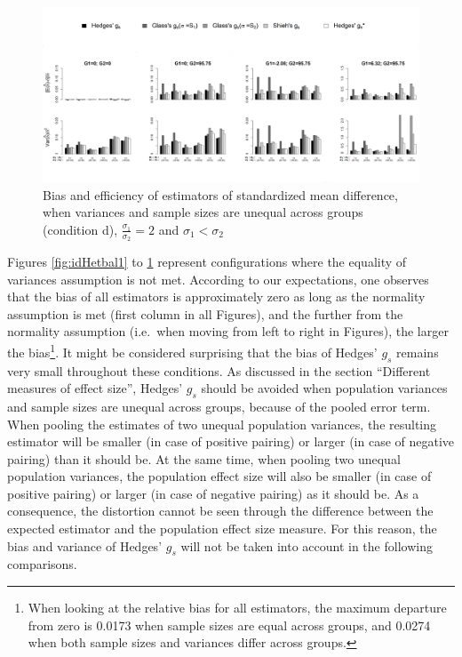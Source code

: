 \documentclass[
  english,
  man,floatsintext]{apa6}
\begin{document}
\begin{figure}

{\centering \includegraphics[width=6.31in]{Scripts outputs/Quality of ES measures/Graphs/Unbiased estimators/Combined Figures_relative quality/Het_firstsmaller_SDR2} 

}

\caption{Bias and efficiency of estimators of standardized mean difference, when variances and sample sizes are unequal across groups (condition d), $\frac{\sigma_1}{\sigma_2}=2$ and $\sigma_1<\sigma_2$}\label{fig:idHetunbal4}
\end{figure}

Figures \ref{fig:idHetbal1} to \ref{fig:idHetunbal4} represent configurations where the equality of variances assumption is not met. According to our expectations, one observes that the bias of all estimators is approximately zero as long as the normality assumption is met (first column in all Figures), and the further from the normality assumption (i.e.~when moving from left to right in Figures), the larger the bias\footnote{When looking at the relative bias for all estimators, the maximum departure from zero is 0.0173 when sample sizes are equal across groups, and 0.0274 when both sample sizes and variances differ across groups.}. It might be considered surprising that the bias of Hedges' \(g_s\) remains very small throughout these conditions. As discussed in the section \enquote{Different measures of effect size}, Hedges' \(g_s\) should be avoided when population variances and sample sizes are unequal across groups, because of the pooled error term. When pooling the estimates of two unequal population variances, the resulting estimator will be smaller (in case of positive pairing) or larger (in case of negative pairing) than it should be. At the same time, when pooling two unequal population variances, the population effect size will also be smaller (in case of positive pairing) or larger (in case of negative pairing) as it should be. As a consequence, the distortion cannot be seen through the difference between the expected estimator and the population effect size measure. For this reason, the bias and variance of Hedges' \(g_s\) will not be taken into account in the following comparisons.
\end{document}

